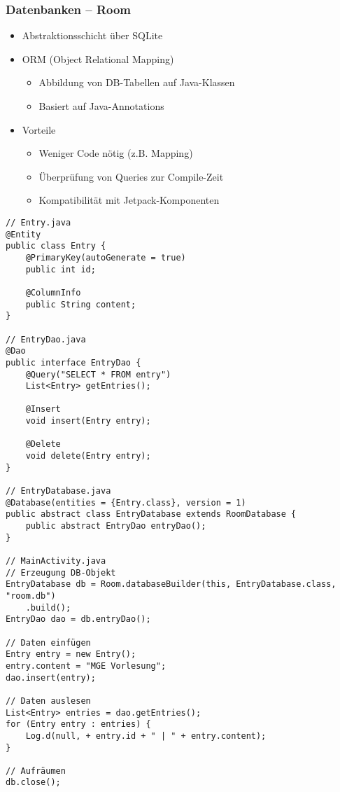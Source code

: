 \subsubsection{Datenbanken – Room}
\begin{itemize}[topsep=0pt, leftmargin=4mm]
    \setlength\itemsep{-0.3em}
    \item Abstraktionsschicht über SQLite
    \item ORM (Object Relational Mapping)
    \begin{itemize}[topsep=0pt, leftmargin=4mm]
        \setlength\itemsep{-0.3em}
        \item Abbildung von DB-Tabellen auf Java-Klassen
        \item Basiert auf Java-Annotations
    \end{itemize}
    \item Vorteile
    \begin{itemize}[topsep=0pt, leftmargin=4mm]
        \setlength\itemsep{-0.3em}
        \item Weniger Code nötig (z.B. Mapping)
        \item Überprüfung von Queries zur Compile-Zeit
        \item Kompatibilität mit Jetpack-Komponenten
    \end{itemize}
\end{itemize}
\begin{lstlisting}
// Entry.java
@Entity
public class Entry {
    @PrimaryKey(autoGenerate = true)
    public int id;

    @ColumnInfo
    public String content;
}

// EntryDao.java
@Dao
public interface EntryDao {
    @Query("SELECT * FROM entry")
    List<Entry> getEntries();

    @Insert
    void insert(Entry entry);

    @Delete
    void delete(Entry entry);
}

// EntryDatabase.java
@Database(entities = {Entry.class}, version = 1)
public abstract class EntryDatabase extends RoomDatabase {
    public abstract EntryDao entryDao();
}

// MainActivity.java
// Erzeugung DB-Objekt
EntryDatabase db = Room.databaseBuilder(this, EntryDatabase.class, "room.db")
    .build();
EntryDao dao = db.entryDao();

// Daten einfügen
Entry entry = new Entry();
entry.content = "MGE Vorlesung";
dao.insert(entry);

// Daten auslesen
List<Entry> entries = dao.getEntries();
for (Entry entry : entries) {
    Log.d(null, + entry.id + " | " + entry.content);
}

// Aufräumen
db.close();
\end{lstlisting}

